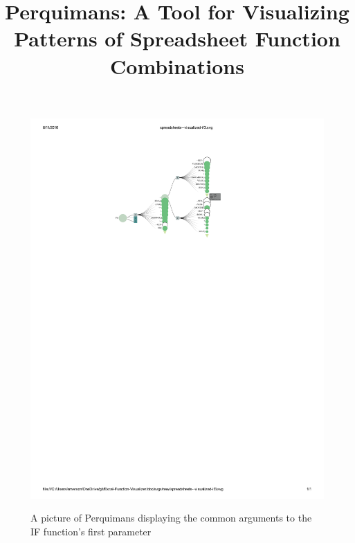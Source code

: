\documentclass[conference]{IEEEtran}
\newcommand{\toolname}{Perquimans }
\newcommand{\toolnameend}{Perquimans}
\begin{document}
	\title{\toolnameend: A Tool for Visualizing Patterns of Spreadsheet Function Combinations}
	
	
	\author{ 
		}
	
	
	\maketitle
	
	\begin{figure}[t] \centering \includegraphics[scale=.6]{IFargslabel} \caption{A
			picture of \toolname displaying the common arguments to the IF function's first 
			parameter} \centering \label{fig:fullpic} \end{figure}
	
\end{document}
